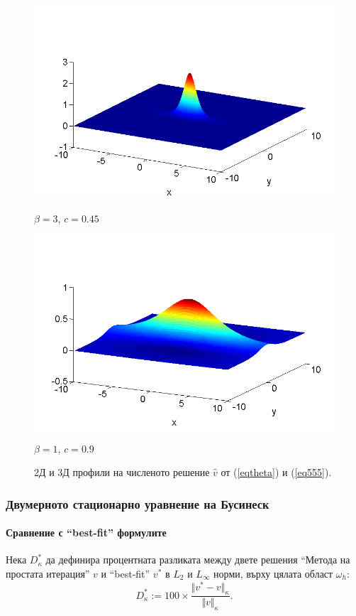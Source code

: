 \documentclass{beamer}
\newcommand{\rf}[1]{(\ref{#1})}
\begin{document}
\begin{frame}
\begin{figure}[ht]
	\begin{minipage}[b]{0.45\linewidth}
		 \raggedleft
		\includegraphics[width=\linewidth]{../Thesis/SolutionView/ChristovIC_30_bt3_c045_prpview.png}		
		\centerline{$\beta = 3$, $c = 0.45$ }
	\end{minipage}
	\begin{minipage}[b]{0.45\linewidth}
		 \raggedright
		\includegraphics[width=\linewidth]{../Thesis/SolutionView/ChristovIC_128_bt1_c090_prpview.png}
		\centerline{$\beta = 1$, $c = 0.9$}
	\end{minipage}
	\caption{2Д и 3Д профили на численото решение $\widehat v$ от \rf{eqtheta} и \rf{eq555}.}
	\label{fig:solutions}
\end{figure}

\end{frame}

\begin{frame}
\frametitle{Двумерното стационарно уравнение на Бусинеск}
\framesubtitle{Сравнение с ``best-fit'' формулите}

Нека $D^*_{\kappa}$ да дефинира процентната разликата между двете решения  ``Метода на простата итерация'' $v$ и ``best-fit'' $v^*$ в ${L_2 }$ и ${L_\infty}$ норми, върху цялата област $\omega_h$:
\begin{equation}\label{diffvv}
D^*_{\kappa} := 100 \times \frac{\Vert v^*-v \Vert_{\kappa} }{ \Vert v \Vert_{\kappa} }.
\end{equation}
\end{frame}
\end{document}
